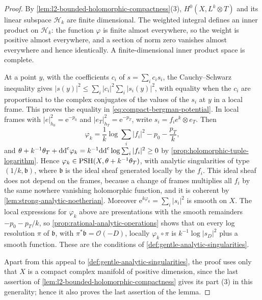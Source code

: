 \begin{proof}
By \cref{lem:l2-bounded-holomorphic-compactness}(3), $H^0(X,L^k\otimes T)$ and its linear subspace $\mathcal H_k$ are finite dimensional. The weighted integral defines an inner product on $\mathcal H_k$: the function $\varphi$ is finite almost everywhere, so the weight is positive almost everywhere, and a section of norm zero vanishes almost everywhere and hence identically. A finite-dimensional inner product space is complete.

At a point $y$, with the coefficients $c_i$ of $s=\sum_ic_is_i$, the Cauchy--Schwarz inequality gives $|s(y)|^2\leq\sum_i|c_i|^2\sum_i|s_i(y)|^2$, with equality when the $c_i$ are proportional to the complex conjugates of the values of the $s_i$ at $y$ in a local frame. This proves the equality in \eqref{eq:compact-bergman-potential}. In local frames with $|e|_{h_0}^2=\mathrm e^{-p_0}$ and $|e_T|_{h_T}^2=\mathrm e^{-p_T}$, write $s_i=f_ie^k\otimes e_T$. Then
\[
 \varphi_k=\frac1k\log\sum_i|f_i|^2-p_0-\frac{p_T}k,
\]
and $\theta+k^{-1}\theta_T+\mathrm{dd}^{\mathrm{c}}\varphi_k=k^{-1}\mathrm{dd}^{\mathrm{c}}\log\sum_i|f_i|^2\geq0$ by \cref{prop:holomorphic-tuple-logarithm}. Hence $\varphi_k\in\mathrm{PSH}(X,\theta+k^{-1}\theta_T)$, with analytic singularities of type $(1/k,\mathfrak b)$, where $\mathfrak b$ is the ideal sheaf generated locally by the $f_i$. This ideal sheaf does not depend on the frames, because a change of frames multiplies all $f_i$ by the same nowhere vanishing holomorphic function, and it is coherent by \cref{lem:strong-analytic-noetherian}. Moreover $\mathrm e^{k\varphi_k}=\sum_i|s_i|^2$ is smooth on $X$. The local expressions for $\varphi_k$ above are presentations with the smooth remainders $-p_0-p_T/k$, so \cref{prop:rational-analytic-operations} shows that on every log resolution $\pi$ of $\mathfrak b$, with $\pi^*\mathfrak b=\mathcal O(-D)$, locally $\varphi_k\circ\pi$ is $k^{-1}\log|s_D|^2$ plus a smooth function. These are the conditions of \cref{def:gentle-analytic-singularities}.

Apart from this appeal to \cref{def:gentle-analytic-singularities}, the proof uses only that $X$ is a compact complex manifold of positive dimension, since the last assertion of \cref{lem:l2-bounded-holomorphic-compactness} gives its part (3) in this generality; hence it also proves the last assertion of the lemma.
\end{proof}


